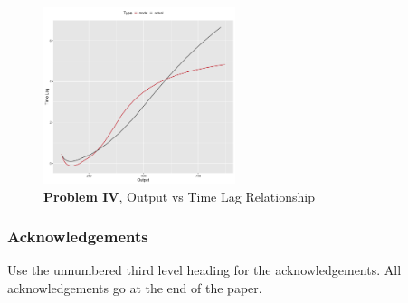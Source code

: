 \documentclass[twoside]{article}
\begin{document}
\begin{figure}[h]
\vspace{.3in}
\centerline{\includegraphics[width=0.5\textwidth]{figures/exp4_predictive_curves.png}}
\vspace{.3in}
\caption{\textbf{Problem IV}, Output vs Time Lag Relationship}
\label{fig:problem4_curves}
\end{figure}


\subsubsection*{Acknowledgements}

Use the unnumbered third level heading for the acknowledgements.  All
acknowledgements go at the end of the paper.


\end{document}

